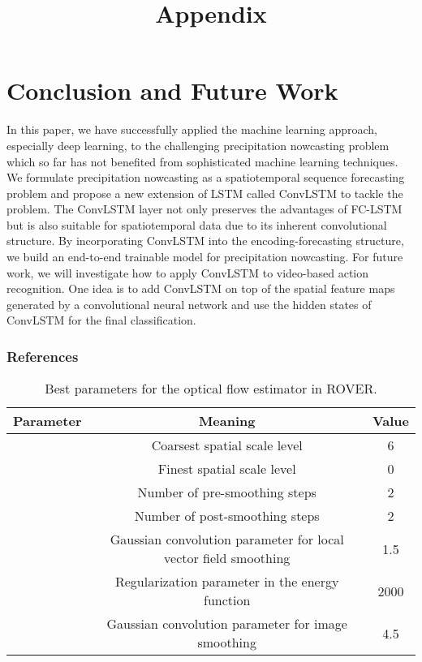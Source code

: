 \documentclass{article} \usepackage{amsmath}
\begin{document}
\section{Conclusion and Future Work}

In this paper, we have successfully applied the machine learning approach, especially deep learning, to the challenging precipitation nowcasting problem which so far has not benefited from sophisticated machine learning techniques. We formulate precipitation nowcasting as a spatiotemporal sequence forecasting problem and propose a new extension of LSTM called ConvLSTM to tackle the problem. The ConvLSTM layer not only preserves the advantages of FC-LSTM but is also suitable for spatiotemporal data due to its inherent convolutional structure. By incorporating \mbox{ConvLSTM} into the encoding-forecasting structure, we build an end-to-end trainable model for precipitation nowcasting. For future work, we will investigate how to apply ConvLSTM to video-based action recognition. One idea is to add ConvLSTM on top of the spatial feature maps generated by a convolutional neural network and use the hidden states of ConvLSTM for the final classification.
\subsubsection*{References}

\begingroup
\renewcommand{\section}[2]{}
\small{

}
\endgroup


\title{Appendix}

\section*{Appendix}

\begin{table}[!h]
\vspace{-1em}
\caption{Best parameters for the optical flow estimator in ROVER.}
\begin{center}
\begin{tabular}{|c|c|c|}

\hline
Parameter & Meaning & Value\\
\hline
\hline
 & Coarsest spatial scale level & 6\\
 & Finest spatial scale level & 0\\
 & Number of pre-smoothing steps & 2\\
 & Number of post-smoothing steps & 2\\
 & Gaussian convolution parameter for local vector field smoothing & 1.5\\
 & Regularization parameter in the energy function & 2000\\
 & Gaussian convolution parameter for image smoothing & 4.5\\
\hline
\end{tabular}
\end{center}
\vspace{-1em}
\label{tbl:parameter}
\end{table}
\end{document}
